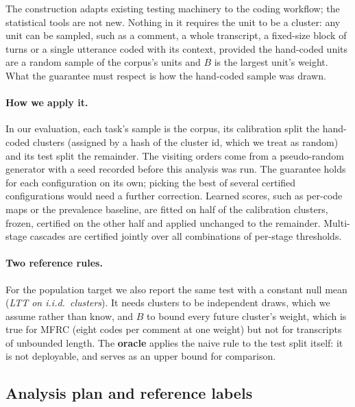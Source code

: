 The construction adapts existing testing machinery to the coding workflow; the statistical tools are not new. Nothing in
it requires the unit to be a cluster: any unit can be sampled, such as a comment, a whole transcript, a fixed-size block of
turns or a single utterance coded with its context, provided the hand-coded units are a random sample of the corpus's units
and $B$ is the largest unit's weight. What the guarantee must respect is how the hand-coded sample was drawn.

\paragraph{How we apply it.} In our evaluation, each task's sample is the corpus, its calibration split the hand-coded
clusters (assigned by a hash of the cluster id, which we treat as random) and its test split the remainder. The visiting
orders come from a pseudo-random generator with a seed recorded before this analysis was run. The guarantee holds for each
configuration on its own; picking the best of several certified configurations would need a further correction. Learned
scores, such as per-code maps or the prevalence baseline, are fitted on half of the calibration clusters, frozen, certified
on the other half and applied unchanged to the remainder. Multi-stage cascades are certified jointly over all combinations
of per-stage thresholds.

\paragraph{Two reference rules.} For the population target we also report the same test with a constant null mean
(\emph{LTT on i.i.d.\ clusters}). It needs clusters to be independent draws, which we assume rather than know, and $B$ to
bound every future cluster's weight, which is true for MFRC (eight codes per comment at one weight) but not for transcripts
of unbounded length. The \textbf{oracle} applies the naive rule to the test split itself: it is not deployable, and serves
as an upper bound for comparison.

\subsection{Analysis plan and reference labels}
\label{sec:plan}
